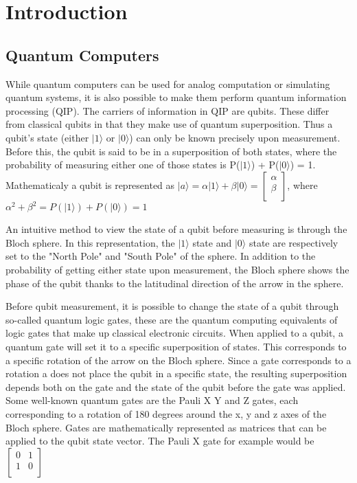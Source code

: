 \section{Introduction}
\label{sec:intro}



\subsection{Quantum Computers}
\label{sec:QC}
While quantum computers can be used for analog computation or simulating quantum systems, %
it is also possible to make them perform quantum information processing (QIP). The carriers of information in QIP are qubits. These differ from classical qubits
in that they make use of quantum superposition. Thus a qubit's state (either $|1 \rangle$ or $|0 \rangle$) can only be known precisely upon measurement. Before this,
the qubit is said to be in a superposition of both states, where the probability of measuring either one of those states is P($|1 \rangle$) + P($|0 \rangle$) = 1.
Mathematicaly a qubit is represented as $ |a \rangle = \alpha|1 \rangle + \beta|0 \rangle =  \begin{bmatrix}
    \alpha \\
    \beta \\
\end{bmatrix}$, where $\alpha^2 + \beta^2 = P(|1 \rangle) + P(|0 \rangle) = 1$


  An intuitive method to view the state of a qubit before measuring is through the Bloch sphere. %
In this representation, the  $|1 \rangle$ state and $|0 \rangle$ state are respectively set to the "North Pole" and "South Pole" of the sphere. In addition to the 
probability of getting either state upon measurement, the Bloch sphere shows the phase of the qubit thanks to the latitudinal direction of the arrow in the sphere.

Before qubit measurement, it is possible to change the state of a qubit through so-called quantum logic gates, these are the quantum computing equivalents of logic 
gates that make up classical electronic circuits. When applied to a qubit, a quantum gate will set it to a specific superposition of states. This corresponds to a 
specific rotation of the arrow on the Bloch sphere. Since a gate corresponds to a rotation a does not place the qubit in a specific state, the resulting superposition
depends both on the gate and the state of the qubit before the gate was applied. Some well-known quantum gates are the Pauli X Y and Z gates, each corresponding to a 
rotation of 180 degrees around the x, y and z axes of the Bloch sphere. Gates are mathematically represented as matrices that can be applied to the qubit state vector.
The Pauli X gate for example would be $\begin{bmatrix}
    0 & 1\\
    1 & 0\\
\end{bmatrix}$

